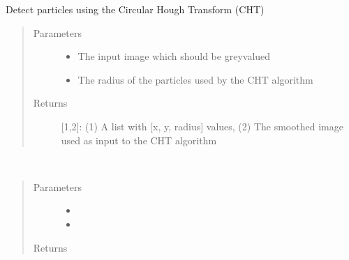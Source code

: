 \documentclass[letterpaper,10pt,english]{sphinxmanual}
\begin{document}

\begin{fulllineitems}
\label{\detokenize{index:mlpy.detection.detection_cht}}
Detect particles using the Circular Hough Transform (CHT)
\begin{quote}\begin{description}
\item[{Parameters}] \leavevmode\begin{itemize}
\item {} 
 \textendash{} The input image which should be grey\sphinxhyphen{}valued

\item {} 
 \textendash{} The radius of the particles used by the CHT algorithm

\end{itemize}

\item[{Returns}] \leavevmode
{[}1,2{]}:
(1) A list with {[}x, y, radius{]} values,
(2) The smoothed image used as input to the CHT algorithm

\end{description}\end{quote}

\end{fulllineitems}


\begin{fulllineitems}
\label{\detokenize{index:mlpy.detection.detection_laplace}}~\begin{quote}\begin{description}
\item[{Parameters}] \leavevmode\begin{itemize}
\item {} 
 \textendash{} 

\item {} 
 \textendash{} 

\end{itemize}

\item[{Returns}] \leavevmode


\end{description}\end{quote}

\end{fulllineitems}
\end{document}
